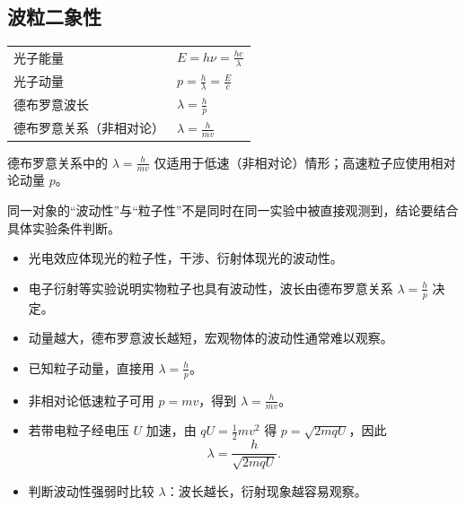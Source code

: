 
\subsection{波粒二象性}
\begin{tabularx}{\columnwidth}{XX}
  光子能量&$E=h\nu=\frac{hc}{\lambda}$\\
  光子动量&$p=\frac{h}{\lambda}=\frac{E}{c}$\\
  德布罗意波长&$\lambda=\frac{h}{p}$\\
  德布罗意关系（非相对论）&$\lambda=\frac{h}{mv}$\\
\end{tabularx}

\begin{formulanotebox}
德布罗意关系中的 $\lambda=\frac{h}{mv}$ 仅适用于低速（非相对论）情形；高速粒子应使用相对论动量 $p$。

同一对象的“波动性”与“粒子性”不是同时在同一实验中被直接观测到，结论要结合具体实验条件判断。
\end{formulanotebox}

\begin{keypointbox}
\begin{itemize}[leftmargin=1.5em]
  \item 光电效应体现光的粒子性，干涉、衍射体现光的波动性。
  \item 电子衍射等实验说明实物粒子也具有波动性，波长由德布罗意关系 $\lambda=\frac{h}{p}$ 决定。
  \item 动量越大，德布罗意波长越短，宏观物体的波动性通常难以观察。
\end{itemize}
\end{keypointbox}

\begin{casetypebox}[title={\strut\textcolor{white}{\bfseries 常见题型：德布罗意波长计算}}]
\begin{itemize}[leftmargin=1.5em]
  \item 已知粒子动量，直接用 $\lambda=\frac{h}{p}$。
  \item 非相对论低速粒子可用 $p=mv$，得到 $\lambda=\frac{h}{mv}$。
  \item 若带电粒子经电压 $U$ 加速，由 $qU=\frac12mv^2$ 得 $p=\sqrt{2mqU}$，因此
        \[
          \lambda=\frac{h}{\sqrt{2mqU}}.
        \]
  \item 判断波动性强弱时比较 $\lambda$：波长越长，衍射现象越容易观察。
\end{itemize}
\end{casetypebox}